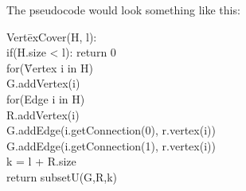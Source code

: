 \documentclass{article}
\begin{document}
\begin{enumerate}
The pseudocode would look something like this:
\begin{tabbing}
Vert\=exCover(H, l):\\
\>if(H.size < l): return 0\\
\>for(\=Vertex i in H)\\
\>\>G.addVertex(i)\\
\>for(Edge i in H)\\
\>\>R.addVertex(i)\\
\>\>G.addEdge(i.getConnection(0), r.vertex(i))\\
\>\>G.addEdge(i.getConnection(1), r.vertex(i))\\
\>k = l + R.size\\
\>return subsetU(G,R,k)\\
\end{tabbing}


\end{enumerate}
\end{document}
